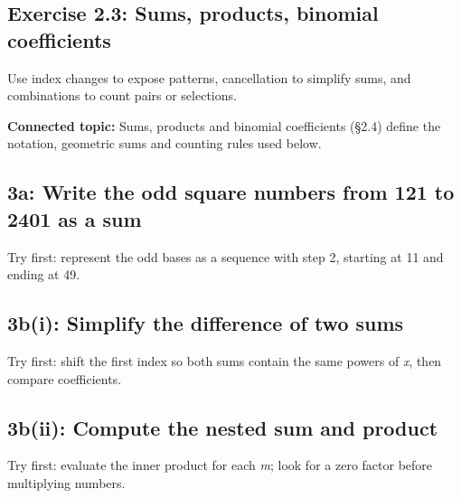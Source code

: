 \documentclass[11pt]{article}
\begin{document}
\begin{keepsection}
\section{Exercise 2.3: Sums, products, binomial coefficients}

Use index changes to expose patterns, cancellation to simplify sums, and combinations to count pairs or selections.

\textbf{Connected topic:} Sums, products and binomial coefficients (§2.4) define the notation, geometric sums and counting rules used below.

\begin{keepsection}
\subsection{3a: Write the odd square numbers from 121 to 2401 as a sum}

Try first: represent the odd bases as a sequence with step 2, starting at 11 and ending at 49.

\end{keepsection}

\begin{keepsection}
\subsection{3b(i): Simplify the difference of two sums}

Try first: shift the first index so both sums contain the same powers of \textit{x}, then compare coefficients.

\end{keepsection}

\begin{keepsection}
\subsection{3b(ii): Compute the nested sum and product}

Try first: evaluate the inner product for each \textit{m}; look for a zero factor before multiplying numbers.


\end{keepsection}
\end{keepsection}
\end{document}
